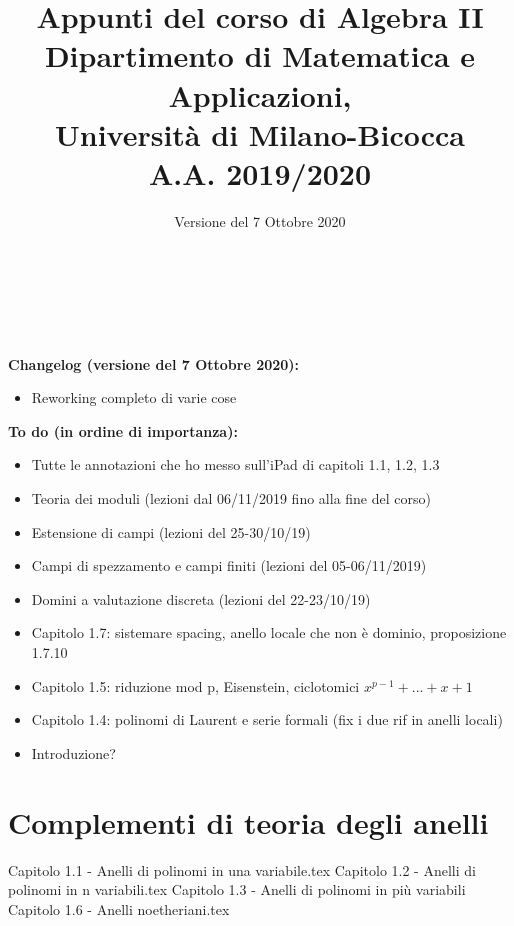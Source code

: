 \documentclass{article}
\begin{document}
\AddToShipoutPicture*{\BackgroundPic}

\title{\Huge{\textbf{Appunti del corso di Algebra II}} \\ \vspace{3mm}
	   \LARGE{\textbf{Dipartimento di Matematica e Applicazioni,}} \\ 
	   \LARGE{\textbf{Università di Milano-Bicocca}} \\ \vspace{3mm}
	   \Large{\textbf{A.A. 2019/2020}} %
	   }
\author{Versione del 7 Ottobre 2020}
\date{}

\maketitle
\thispagestyle{empty}
\clearpage

\tableofcontents

\

\

\noindent \textbf{Changelog (versione del 7 Ottobre 2020):}
\begin{itemize}
\item Reworking completo di varie cose
\end{itemize}

\noindent \textbf{To do (in ordine di importanza):}
\begin{itemize}
	\item Tutte le annotazioni che ho messo sull'iPad di capitoli 1.1, 1.2, 1.3
	\item Teoria dei moduli (lezioni dal 06/11/2019 fino alla fine del corso)
	\item Estensione di campi (lezioni del 25-30/10/19)
	\item Campi di spezzamento e campi finiti (lezioni del 05-06/11/2019)
	\item Domini a valutazione discreta (lezioni del 22-23/10/19)
	\item Capitolo 1.7: sistemare spacing, anello locale che non è dominio, proposizione 1.7.10
	\item Capitolo 1.5: riduzione mod p, Eisenstein, ciclotomici $x^{p-1}+...+x+1$
	\item Capitolo 1.4: polinomi di Laurent e serie formali (fix i due rif in anelli locali)
	\item Introduzione?
\end{itemize}
\clearpage

\section{Complementi di teoria degli anelli}
{Capitolo 1.1 - Anelli di polinomi in una variabile.tex}
{Capitolo 1.2 - Anelli di polinomi in n variabili.tex}
{Capitolo 1.3 - Anelli di polinomi in più variabili}
{Capitolo 1.6 - Anelli noetheriani.tex}
\end{document}
